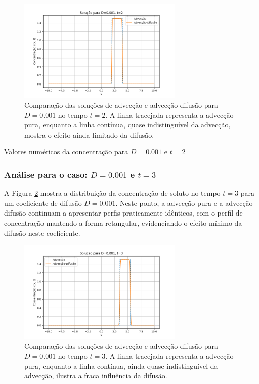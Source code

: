 \begin{figure}[H]
    \centering
    \includegraphics[width=0.7\textwidth]{code/plot/Advec_Difus_t2_D0.001.png}
    \caption{Comparação das soluções de advecção e advecção-difusão para \( D = 0.001 \) no tempo \( t = 2 \). A linha tracejada representa a advecção pura, enquanto a linha contínua, quase indistinguível da advecção, mostra o efeito ainda limitado da difusão.}
    \label{fig:advec_diffus_0.001_t2}
\end{figure}

\begin{table}[H]
    \centering
    \caption{Valores numéricos da concentração para \( D = 0.001 \) e \( t = 2 \)}
    
\end{table}

\subsubsection{Análise para o caso: \( D = 0.001 \) e \( t = 3 \)}

A Figura \ref{fig:advec_diffus_0.001_t3} mostra a distribuição da concentração de soluto no tempo \( t = 3 \) para um coeficiente de difusão \( D = 0.001 \). Neste ponto, a advecção pura e a advecção-difusão continuam a apresentar perfis praticamente idênticos, com o perfil de concentração mantendo a forma retangular, evidenciando o efeito mínimo da difusão neste coeficiente.

\begin{figure}[H]
    \centering
    \includegraphics[width=0.7\textwidth]{code/plot/Advec_Difus_t3_D0.001.png}
    \caption{Comparação das soluções de advecção e advecção-difusão para \( D = 0.001 \) no tempo \( t = 3 \). A linha tracejada representa a advecção pura, enquanto a linha contínua, ainda quase indistinguível da advecção, ilustra a fraca influência da difusão.}
    \label{fig:advec_diffus_0.001_t3}
\end{figure}

